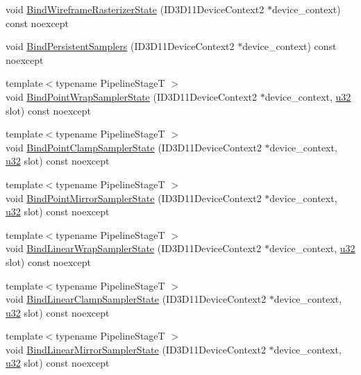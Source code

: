 \begin{DoxyCompactItemize}
\item 
void \hyperlink{structmage_1_1_rendering_state_cache_a5b962779cff508c3d022b9ad5df250f2}{Bind\+Wireframe\+Rasterizer\+State} (I\+D3\+D11\+Device\+Context2 $\ast$device\+\_\+context) const noexcept
\item 
void \hyperlink{structmage_1_1_rendering_state_cache_adb1a043be25ba45394b51c98ad78a99c}{Bind\+Persistent\+Samplers} (I\+D3\+D11\+Device\+Context2 $\ast$device\+\_\+context) const noexcept
\item 
{\footnotesize template$<$typename Pipeline\+StageT $>$ }\\void \hyperlink{structmage_1_1_rendering_state_cache_adeb916a9c8c17713a986e9dc923c79aa}{Bind\+Point\+Wrap\+Sampler\+State} (I\+D3\+D11\+Device\+Context2 $\ast$device\+\_\+context, \hyperlink{namespacemage_af2b398bf98eb10351f49cad73fe2cc73}{u32} slot) const noexcept
\item 
{\footnotesize template$<$typename Pipeline\+StageT $>$ }\\void \hyperlink{structmage_1_1_rendering_state_cache_aa404291463420b6a812af35e3877917c}{Bind\+Point\+Clamp\+Sampler\+State} (I\+D3\+D11\+Device\+Context2 $\ast$device\+\_\+context, \hyperlink{namespacemage_af2b398bf98eb10351f49cad73fe2cc73}{u32} slot) const noexcept
\item 
{\footnotesize template$<$typename Pipeline\+StageT $>$ }\\void \hyperlink{structmage_1_1_rendering_state_cache_a1495f012d87fb97cb83d8d716190c6cd}{Bind\+Point\+Mirror\+Sampler\+State} (I\+D3\+D11\+Device\+Context2 $\ast$device\+\_\+context, \hyperlink{namespacemage_af2b398bf98eb10351f49cad73fe2cc73}{u32} slot) const noexcept
\item 
{\footnotesize template$<$typename Pipeline\+StageT $>$ }\\void \hyperlink{structmage_1_1_rendering_state_cache_a742971c8d5549e134558188daaa40933}{Bind\+Linear\+Wrap\+Sampler\+State} (I\+D3\+D11\+Device\+Context2 $\ast$device\+\_\+context, \hyperlink{namespacemage_af2b398bf98eb10351f49cad73fe2cc73}{u32} slot) const noexcept
\item 
{\footnotesize template$<$typename Pipeline\+StageT $>$ }\\void \hyperlink{structmage_1_1_rendering_state_cache_a36258ec643ef6e4c194e336242fd2eae}{Bind\+Linear\+Clamp\+Sampler\+State} (I\+D3\+D11\+Device\+Context2 $\ast$device\+\_\+context, \hyperlink{namespacemage_af2b398bf98eb10351f49cad73fe2cc73}{u32} slot) const noexcept
\item 
{\footnotesize template$<$typename Pipeline\+StageT $>$ }\\void \hyperlink{structmage_1_1_rendering_state_cache_abe7c35de2e36437d527e8df276df3728}{Bind\+Linear\+Mirror\+Sampler\+State} (I\+D3\+D11\+Device\+Context2 $\ast$device\+\_\+context, \hyperlink{namespacemage_af2b398bf98eb10351f49cad73fe2cc73}{u32} slot) const noexcept

\end{DoxyCompactItemize}
